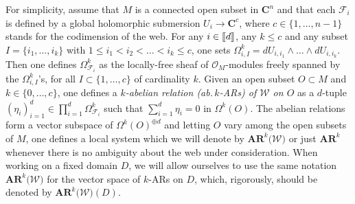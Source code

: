 \documentclass[11pt]{amsart}
\begin{document}
For simplicity, assume that $M$ is a connected open subset in $\mathbf C^n$ and that each $\mathcal F_i$ is defined by a global holomorphic submersion $U_i\rightarrow \mathbf C^c$, where $c\in \{1,\ldots,n-1\}$ stands for the codimension of the web. For any $
i \in [\hspace{-0.05cm}[ d
]\hspace{-0.05cm}]$, any 
$k\leq c$ and any subset $I=\{i_1,\ldots,i_k\}$
with $1\leq i_1<i_2<\ldots < i_k\leq c$, one sets 
$\Omega_{i,I}^k=dU_{i,i_1}\wedge \ldots \wedge dU_{i,i_k}$. Then one defines 
$\Omega^k_{\mathcal F_i}$ as the locally-free sheaf of $\mathcal O_M$-modules  freely spanned   by the $\Omega_{i,I}^k$'s,  for all  $I\subset \{1,\ldots,c\}$ of cardinality $k$. Given an open subset $O\subset M$ and $k
\in \{0,\ldots,c\}$, one defines a {\it $k$-abelian relation (ab.\,$k$-ARs) of $\boldsymbol{\mathcal W}$
 on $O$} as a $d$-tuple $(\eta_i)_{i=1}^d \in \prod_{i=1}^d \Omega^k_{\mathcal F_i}$ such that $\sum_{i=1}^d \eta_i=0$ in $\Omega^k(O)$.  The abelian relations form a vector subspace of $\Omega^k(O)^{\oplus d}$ and letting $O$ vary among the open subsets of $M$, one defines a local system which we will denote by 
 $\boldsymbol{AR}^k\big(\boldsymbol{\mathcal W} \big)$ or just 
$\boldsymbol{AR}^k$ whenever there is no ambiguity about the web under consideration.  When working on a fixed domain $D$, we will allow ourselves to use the same notation $\boldsymbol{AR}^k\big(\boldsymbol{\mathcal W} \big)$ for the
vector space of $k$-ARs on $D$, which, rigorously, should be denoted by 
$\boldsymbol{AR}^k\big(\boldsymbol{\mathcal W} \big)(D)$. 
\end{document}
